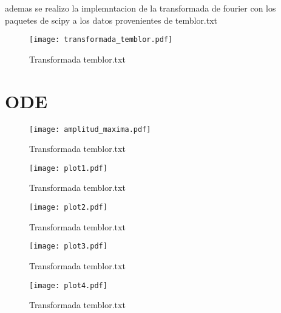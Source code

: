 ademas se realizo la implemntacion de la transformada de fourier con los paquetes de scipy a los datos provenientes de temblor.txt

\begin{figure}[h!]
\centering
\texttt{[image: transformada\_temblor.pdf]}
\caption{Transformada temblor.txt }
\label{Fig.}
\end{figure}


\section{ODE}

\begin{figure}[h!]
\centering
\texttt{[image: amplitud\_maxima.pdf]}
\caption{Transformada temblor.txt }
\label{Fig.}
\end{figure}

\begin{figure}[h!]
\centering
\texttt{[image: plot1.pdf]}
\caption{Transformada temblor.txt }
\label{Fig.}
\end{figure}

\begin{figure}[h!]
\centering
\texttt{[image: plot2.pdf]}
\caption{Transformada temblor.txt }
\label{Fig.}
\end{figure}

\begin{figure}[h!]
\centering
\texttt{[image: plot3.pdf]}
\caption{Transformada temblor.txt }
\label{Fig.}
\end{figure}

\begin{figure}[h!]
\centering
\texttt{[image: plot4.pdf]}
\caption{Transformada temblor.txt }
\label{Fig.}
\end{figure}



